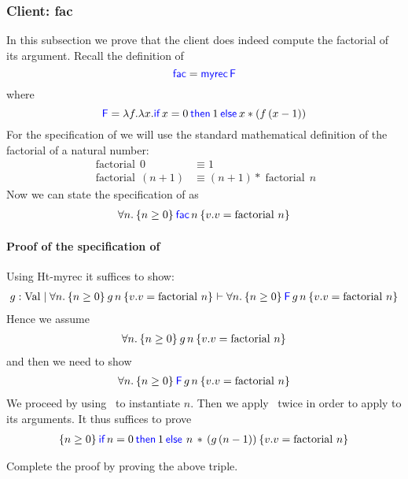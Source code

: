 \subsubsection*{Client: fac}
In this subsection we prove that the client  does indeed compute the factorial of its argument. Recall the definition of 
\begin{displaymath}
{\textsf{\color{blue} fac}} = \textsf{\color{blue} myrec} \, \textsf{\color{blue} F}
\end{displaymath}
where
\begin{displaymath}
{\langkw{F}} = 
     \lambda f. \lambda x. \If {x = 0} then 1 \Else x * (f \, (x-1))
\end{displaymath}
For the specification of  we will use the standard mathematical definition of the factorial of a natural number:
\begin{align*}
\operatorname{factorial} \, 0 &\equiv 1 \\
\operatorname{factorial} \, (n+1)  &\equiv (n+1) * \operatorname{factorial} \, n															
\end{align*}
Now we can state the specification of  as
\begin{align*}
\All n. \hoare{n \geq 0 } {\langkw{fac}\, n}{v. v =\operatorname{factorial} \, n }
\end{align*}

\paragraph*{Proof of the specification of }

Using Ht-myrec it suffices to show:
\begin{align*}
g:\Val \mid \All n. \hoare{ n\geq 0}{g\, n}{v. v =\operatorname{factorial} \, n } \proves \All n. \hoare{n \geq 0 } {\langkw{F}\, g\, n} {v. v =\operatorname{factorial} \, n }
\end{align*}
Hence we assume
\begin{align*}
\All n. \hoare{ n \geq 0}{g \, n}{v. v =\operatorname{factorial} \, n } 
\end{align*}
and then we need to show
\begin{align*}
\All n. \hoare{ n \geq 0 } {\langkw{F}\, g\, n} {v.  v =\operatorname{factorial} \, n }
\end{align*}
We proceed by using~ to instantiate $n$. Then we apply~ twice in order to apply  to its arguments. It thus suffices to prove
\begin{align*}
 \hoare{ n \geq 0} {\If {n = 0} then 1 \Else \, n\,  * \, (g \, (n-1))} {v. v =\operatorname{factorial} \, n }
\end{align*}

\begin{exercise}
Complete the proof by proving the above triple.
\end{exercise}

